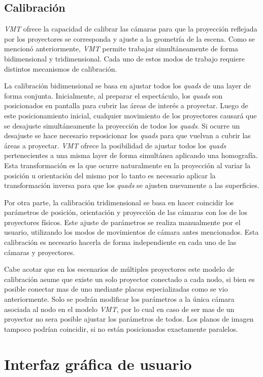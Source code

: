 \subsection{Calibración}

\emph{VMT} ofrece la capacidad de calibrar las cámaras para que la proyección reflejada por los proyectores se corresponda y ajuste a la geometría de la escena.
Como se mencionó anteriormente, \emph{VMT} permite trabajar simultáneamente de forma bidimensional y tridimensional. Cada uno de estos modos de trabajo requiere distintos mecanismos de calibración.

La calibración bidimensional se basa en ajustar todos los \emph{quads} de una layer de forma conjunta.
Inicialmente, al preparar el espectáculo, los \emph{quads} son posicionados en pantalla para cubrir las áreas de interés a proyectar. Luego de este posicionamiento inicial, cualquier movimiento de los proyectores causará que se desajuste simultáneamente la proyección de todos los \emph{quads}. Si ocurre un desajuste se hace necesario reposicionar los \emph{quads} para que vuelvan a cubrir las áreas a proyectar.
\emph{VMT} ofrece la posibilidad de ajustar todos los \emph{quads} pertenecientes a una misma layer de forma simultánea aplicando una homografía. Esta transformación es la que ocurre naturalmente en la proyección al variar la posición u orientación del mismo por lo tanto es necesario aplicar la transformación inversa para que los \emph{quads} se ajusten nuevamente a las superficies.

Por otra parte, la calibración tridimensional se basa en hacer coincidir los parámetros de posición, orientación y proyección de las cámaras con los de los proyectores físicos. Este ajuste de parámetros se realiza manualmente por el usuario, utilizando los modos de movimientos de cámara antes mencionados. Esta calibración es necesario hacerla de forma independiente en cada uno de las cámaras y proyectores.

Cabe acotar que en los escenarios de múltiples proyectores este modelo de calibración asume que existe un solo proyector conectado a cada nodo, si bien es posible conectar mas de uno mediante placas especializadas como se vio anteriormente. Solo se podrán modificar los parámetros a la única cámara asociada al nodo en el modelo \emph{VMT}, por lo cual en caso de ser mas de un proyector no sera posible ajustar los parámetros de todos. Los planos de imagen tampoco podrían coincidir, si no están posicionados exactamente paralelos.


\section{Interfaz gráfica de usuario}

